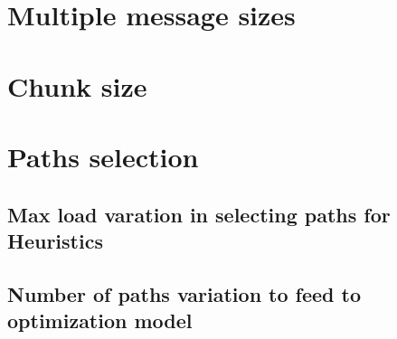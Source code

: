 \documentclass[letter]{article}
\begin{document}
\section{Multiple message sizes}

\section{Chunk size}

\section{Paths selection}

\subsection{Max load varation in selecting paths for Heuristics}

\subsection{Number of paths variation to feed to optimization model}
\end{document}
